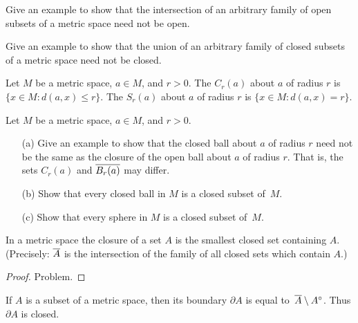 \begin{prob} Give an example to show that the intersection of an arbitrary family of open subsets
of a metric space need not be open.
\end{prob}

\begin{prob} Give an example to show that the union of an arbitrary family of closed subsets of a
metric space need not be closed.
\end{prob}

\begin{defn} Let $M$ be a metric space, $a \in M$, and $r > 0$.  The
 $C_r(a)$ about $a$ of radius $r$ is $\{x \in M \colon d(a,x) \le r\}$. The
 $S_r(a)$ about $a$ of radius $r$ is $\{x \in M \colon d(a,x) = r\}$.
\end{defn}

\begin{prob} Let $M$ be a metric space, $a \in M$, and $r > 0$.
 \begin{enumerate}
  \item[(a)] Give an example to show that the closed ball about $a$ of radius $r$ need not be the
same as the closure of the open ball about $a$ of radius $r$.  That is, the sets $C_r(a)$ and
$\overline{B_r(a)}$ may differ.
  \item[(b)] Show that every closed ball in $M$ is a closed subset of~$M$.
  \item[(c)] Show that every sphere in $M$ is a closed subset of~$M$.
 \end{enumerate}
\end{prob}

\begin{prop} In a metric space the closure of a set $A$ is the smallest closed set
containing $A$.  \textup{(Precisely:} $\overline{A}$ is the intersection of the family of all closed
sets which contain $A$.\textup{)}
\end{prop}

\begin{proof} Problem.  \ns  \end{proof}

\begin{prop} If $A$ is a subset of a metric space, then its boundary $\partial A$ is equal
to~$\overline{A} \setminus A^{\circ}$. Thus $\partial A$ is closed.
\end{prop}

